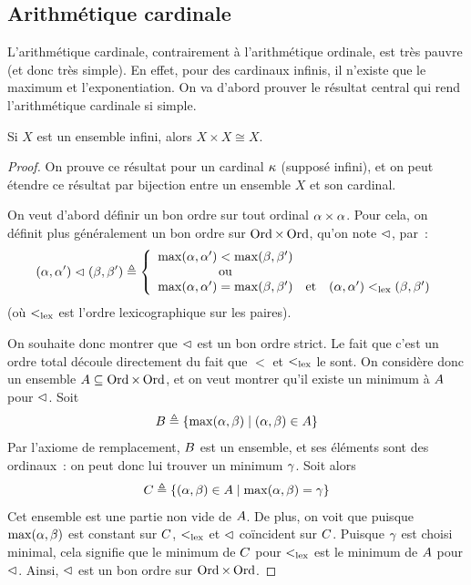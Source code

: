 \subsection{Arithmétique cardinale}

L'arithmétique cardinale, contrairement à l'arithmétique ordinale, est très
pauvre (et donc très simple). En effet, pour des cardinaux infinis, il n'existe
que le maximum et l'exponentiation. On va d'abord prouver le résultat central
qui rend l'arithmétique cardinale si simple.

\begin{theorem}
  Si $X$ est un ensemble infini, alors $X\times X \cong X$.
\end{theorem}

\begin{proof}
  On prouve ce résultat pour un cardinal $\kappa$ (supposé infini), et on peut
  étendre ce résultat par bijection entre un ensemble $X$ et son cardinal.

  On veut d'abord définir un bon ordre sur tout ordinal $\alpha \times \alpha$.
  Pour cela, on définit plus généralement un bon ordre sur $\operatorname{Ord}\times\operatorname{Ord}$,
  qu'on note $\mathrel{\lhd}$, par~:
  \[(\alpha,\alpha')\mathrel{\lhd}(\beta,\beta') \triangleq
  \left\{\begin{array}{ccc}
  \max(\alpha,\alpha') < \max(\beta,\beta') & &\\
  \text{ou} & &\\
  \max(\alpha,\alpha') = \max(\beta,\beta')&\text{et}&
  (\alpha,\alpha')<_{\mathrm{lex}} (\beta,\beta')
  \end{array}\right.\]
  (où $<_{\mathrm{lex}}$ est l'ordre lexicographique sur les paires).

  On souhaite donc montrer que $\mathrel{\lhd}$ est un bon ordre strict. Le fait que
  c'est un ordre total découle directement du fait que $<$ et $<_{\mathrm{lex}}$ le sont.
  On considère donc un ensemble $A\subseteq \operatorname{Ord}\times \operatorname{Ord}$, et on veut
  montrer qu'il existe un minimum à $A$ pour $\mathrel{\lhd}$. Soit
  \[B\triangleq \left\{ \max(\alpha,\beta) \;\middle\vert\; (\alpha,\beta) \in A \right\}\]
  Par l'axiome de remplacement, $B$ est un ensemble, et ses éléments sont
  des ordinaux~: on peut donc lui trouver un minimum $\gamma$. Soit alors
  \[C \triangleq
  \left\{ (\alpha,\beta) \in A \;\middle\vert\; \max(\alpha,\beta) = \gamma \right\}\]
  Cet ensemble est une partie non vide de $A$. De plus, on voit que puisque
  $\max(\alpha,\beta)$ est constant sur $C$, $<_{\mathrm{lex}}$ et $\mathrel{\lhd}$
  coïncident sur $C$. Puisque $\gamma$ est choisi minimal, cela signifie
  que le minimum de $C$ pour $<_{\mathrm{lex}}$ est le minimum de $A$ pour
  $\mathrel{\lhd}$. Ainsi, $\mathrel{\lhd}$ est un bon ordre sur $\operatorname{Ord}\times \operatorname{Ord}$.


\end{proof}
